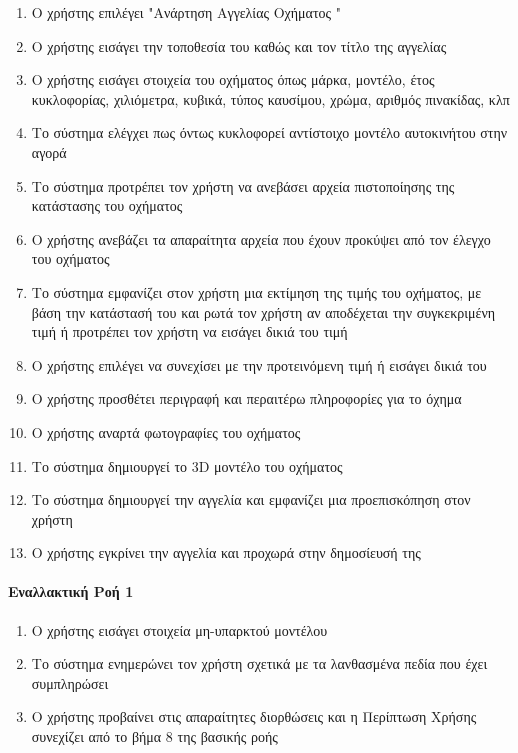\documentclass{../ol-softwaremanual}
\begin{document}
	\begin{enumerate}
		
		\item Ο χρήστης επιλέγει \en"\gr Ανάρτηση Αγγελίας Οχήματος \en"\gr 	
		\item Ο χρήστης εισάγει την τοποθεσία του καθώς και τον τίτλο της αγγελίας
		\item Ο χρήστης εισάγει στοιχεία του οχήματος όπως μάρκα, μοντέλο, έτος κυκλοφορίας, χιλιόμετρα, κυβικά, τύπος καυσίμου, χρώμα, αριθμός πινακίδας, κλπ
		\item Το σύστημα ελέγχει πως όντως κυκλοφορεί αντίστοιχο μοντέλο αυτοκινήτου στην αγορά
		\item Το σύστημα προτρέπει τον χρήστη να ανεβάσει αρχεία πιστοποίησης της κατάστασης του οχήματος
		\item Ο χρήστης ανεβάζει τα απαραίτητα αρχεία που έχουν προκύψει από τον έλεγχο του οχήματος		
		\item Το σύστημα εμφανίζει στον χρήστη μια εκτίμηση της τιμής του οχήματος, με βάση την κατάστασή του και ρωτά τον χρήστη αν αποδέχεται την συγκεκριμένη τιμή ή προτρέπει τον χρήστη να εισάγει δικιά του τιμή
		\item Ο χρήστης επιλέγει να συνεχίσει με την προτεινόμενη τιμή ή εισάγει δικιά του
		\item Ο χρήστης προσθέτει περιγραφή και περαιτέρω πληροφορίες για το όχημα
		\item Ο χρήστης αναρτά φωτογραφίες του οχήματος
		\item Το σύστημα δημιουργεί το \en 3D \gr μοντέλο του οχήματος
		\item Το σύστημα δημιουργεί την αγγελία και εμφανίζει μια προεπισκόπηση στον χρήστη
		\item Ο χρήστης εγκρίνει την αγγελία και προχωρά στην δημοσίευσή της		
	\end{enumerate}
	
	\paragraph{Εναλλακτική Ροή 1}
	
	\begin{enumerate}
		\item O χρήστης εισάγει στοιχεία μη-υπαρκτού μοντέλου
		\item Το σύστημα ενημερώνει τον χρήστη σχετικά με τα λανθασμένα πεδία που έχει συμπληρώσει
		\item Ο χρήστης προβαίνει στις απαραίτητες διορθώσεις και η Περίπτωση Χρήσης συνεχίζει από το βήμα 8 της βασικής ροής
	\end{enumerate}
\end{document}
